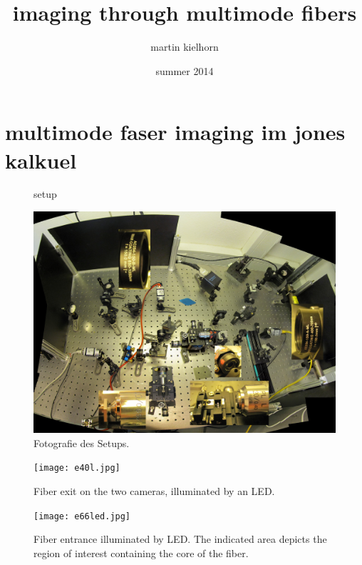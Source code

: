 \documentclass{article}
\author{martin kielhorn}
\title{imaging through multimode fibers}
\date{summer 2014}
\begin{document}
\maketitle
\section{multimode faser imaging im jones kalkuel}

\begin{figure}[htbp]
  \centering
  
  \caption{setup}
  \label{fig:setup}
\end{figure}


\begin{figure}[htbp]
  \centering
  \includegraphics[width=12cm]{../multi-mode-imaging.jpg}
  \caption{Fotografie des Setups. }
  \label{fig:e40}
\end{figure}


\begin{figure}[htbp]
  \centering
  \texttt{[image: e40l.jpg]}
  \caption{Fiber exit on the two cameras, illuminated by an LED.}
  \label{fig:e40}
\end{figure}

\begin{figure}[htbp]
  \centering
  \texttt{[image: e66led.jpg]}
  \caption{Fiber entrance illuminated by LED. The indicated area
    depicts the region of interest containing the core of the fiber.}
  \label{fig:e66}
\end{figure}

\end{document}
